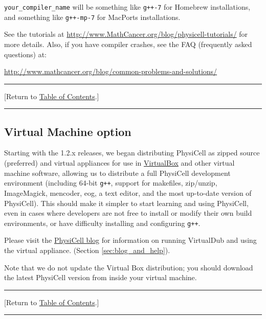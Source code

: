 \documentclass[12pt]{article}
\renewcommand{\v}{\verb}
\newcommand{\blue}[1]{\textcolor{blue}{#1}}
\newcommand{\DONE}{}%
\newcommand{\TOClink}{\begin{center}\hrule\vskip-10pt\phantom{.}\hfill[Return to \hyperlink{TOC}{Table of Contents}.]\hfill\phantom{.}\vskip3pt\hrule\end{center}}
\begin{document}
\v|your_compiler_name| will be something like \v|g++-7| for Homebrew installations, 
and something like \v|g++-mp-7| for MacPorts installations. 

See the tutorials at 
\href{http://www.mathcancer.org/blog/physicell-tutorials/}{http://www.MathCancer.org/blog/physicell-tutorials/}
for more details. Also, if you have compiler crashes, see the FAQ (frequently asked questions) at:

\href{http://www.mathcancer.org/blog/common-problems-and-solutions/}{http://www.mathcancer.org/blog/common-problems-and-solutions/}

\TOClink

\subsection{Virtual Machine option \DONE}
Starting with the 1.2.x releases, we began distributing PhysiCell as zipped source (preferred) %
and virtual appliances for use in \href{http://virtualbox.org}{VirtualBox} and other virtual machine software, 
allowing us to distribute a full PhysiCell 
development environment (including 64-bit \v|g++|, support for makefiles, zip/unzip, 
ImageMagick, mencoder, eog, a text editor, and the most up-to-date 
version of PhysiCell). This should make it simpler to start learning and using PhysiCell, even in cases 
where developers are not free to install or modify their own build environments, 
or have difficulty installing and configuring \v|g++|. 

Please visit the 
\href{http:/PhysiCell.MathCancer.org/blog/physicell-tutorials}{PhysiCell blog} 
for information on running VirtualDub and using the virtual appliance. 
(Section \ref{sec:blog_and_help}). 

Note that we do not update the Virtual Box distribution; you should download the latest PhysiCell version from inside your virtual machine. 
\TOClink

%
\end{document}
